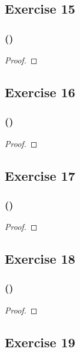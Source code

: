 \documentclass[14pt]{extarticle}
\begin{document}
\subsection{Exercise 15}

\subsubsection{()}

\begin{proof}

\end{proof}

\subsection{Exercise 16}

\subsubsection{()}

\begin{proof}

\end{proof}

\subsection{Exercise 17}

\subsubsection{()}

\begin{proof}

\end{proof}

\subsection{Exercise 18}

\subsubsection{()}

\begin{proof}

\end{proof}

\subsection{Exercise 19}
\end{document}
